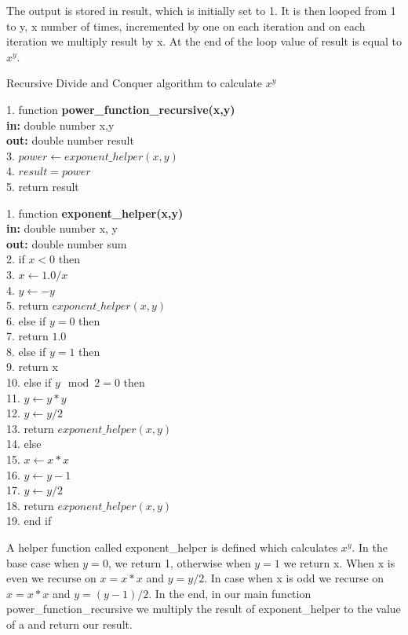 \documentclass{article}
\begin{document}
The output is stored in result, which is initially set to 1. It is then looped from 1 to y, x number of times, incremented by one on each iteration and on each iteration we multiply result by x. At the end of the loop value of result is equal to $x^y$.
\newpage
\begin{algorithm}
\caption{Recursive Divide and Conquer algorithm to calculate $x^y$}
\begin{algorithmic} 
1. function \textbf{power\_function\_recursive(x,y)}\\
\textbf{in: } double number x,y\\
\textbf{out: } double number result\\
3. \STATE $power \leftarrow exponent\_helper(x,y)$\\
4. \STATE $result = power$\\
5. return result
\end{algorithmic}
\end{algorithm}
\begin{algorithm}

\begin{algorithmic} 
1. function \textbf{exponent\_helper(x,y)}\\
\textbf{in: } double number x, y\\
\textbf{out: } double number sum\\
2. if  \STATE $x < 0$  then\\
3. \qquad $x \leftarrow 1.0 / x$ \\
4. \qquad $y \leftarrow -y$ \\
5. \qquad return $exponent\_helper(x,y)$ \\
6. else if \STATE $y = 0$ then \\
7.    \qquad return $1.0$ \\
8. else if \STATE $y = 1$ then \\
9.    \qquad return x \\
10. else if \STATE $y \mod  2 = 0$ then \\
11.    \qquad $y \leftarrow y * y$ \\
12.    \qquad $y \leftarrow y / 2$ \\
13.    \qquad return $exponent\_helper(x, y)$\\
14. else \\
15.    \qquad $x \leftarrow x * x$ \\
16.    \qquad $y \leftarrow y - 1$ \\
17.    \qquad $y \leftarrow y / 2$ \\
18.    \qquad return $exponent\_helper(x, y)$\\
19. end if \\
\end{algorithmic}

\end{algorithm}
A helper function called exponent\_helper is defined which calculates $x^y$. In the base case when $y = 0$, we return 1, otherwise when $y = 1$ we return x. When x is even we recurse on $x = x* x$ and $y = y /2$. In case when x is odd we recurse on $x = x* x$ and $y = (y-1)/ 2$. In the end, in our main function power\_function\_recursive we multiply the result of exponent\_helper to the value of a and return our result.
\end{document}
